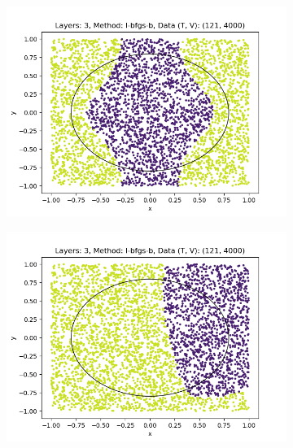 \begin{figure}[h]
\begin{subfigure}[b]{0.45\textwidth}
        \includegraphics[width=\textwidth]{sections/chapters/Quantum-Machine-Learning/Images/Data-Re-Uploading/Layer3-A.png}
    \end{subfigure}
    \begin{subfigure}[b]{0.45\textwidth}
        \centering
        \includegraphics[width=\textwidth]{sections/chapters/Quantum-Machine-Learning/Images/Data-Re-Uploading/Layer3-B.png}
    \end{subfigure}
    \begin{subfigure}[b]{0.45\textwidth}
        \centering

\end{subfigure}
\end{figure}
